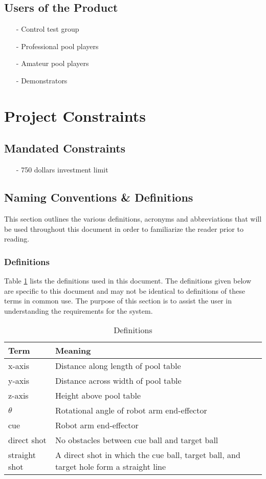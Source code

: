 \documentclass[titlepage]{article}
\begin{document}
\subsection{Users of the Product}
\begin{itemize}
	\item[-] Control test group
	\item[-] Professional pool players
	\item[-] Amateur pool players
	\item[-] Demonstrators
\end{itemize}


\section{Project Constraints}
\subsection{Mandated Constraints}%
\begin{itemize}
	\item[-] 750 dollars investment limit
\end{itemize}

\subsection{Naming Conventions \& Definitions}
This section outlines the various definitions, acronyms and abbreviations that will be used throughout this document in order to familiarize the reader prior to reading.
\subsubsection{Definitions}
Table \ref{tab:Definitions} lists the definitions used in this document. The definitions given below are specific to this document and may not be identical to definitions of these terms in common use. The purpose of this section is to assist the user in understanding the requirements for the system.
\begin{table}[h!]
\centering
\caption{Definitions}
    \begin{tabular}{| p{6cm} | p{6cm} |}\hline
    \textbf{Term}	&\textbf{Meaning}\\\hline
	x-axis					&Distance along length of pool table\\\hline
	y-axis					&Distance across width of pool table\\\hline
	z-axis					&Height above pool table\\\hline
	$\theta$				&Rotational angle of robot arm end-effector\\\hline
	cue 					&Robot arm end-effector\\\hline
	direct shot				&No obstacles between cue ball and target ball\\\hline
	straight shot			&A direct shot in which the cue ball, target ball, and target hole form a straight line\\\hline
    \end{tabular}
\label{tab:Definitions}
\end{table}
\end{document}
